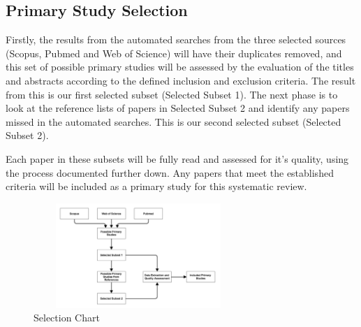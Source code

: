 \documentclass[12pt]{article}
\begin{document}
\subsection{Primary Study Selection}
Firstly, the results from the automated searches from the three selected sources (Scopus, Pubmed and Web of Science) will have their duplicates removed, and this set of possible primary studies will be assessed by the evaluation of the titles and abstracts according to the defined inclusion and exclusion criteria. The result from this is our first selected subset (Selected Subset 1). The next phase is to look at the reference lists of papers in Selected Subset 2 and identify any papers missed in the automated searches. This is our second selected subset (Selected Subset 2). \par 
Each paper in these subsets will be fully read and assessed for it's quality, using the process documented further down. Any papers that meet the established criteria will be included as a primary study for this systematic review. 

\begin{figure}[H]
\centering
\includegraphics[width=300px, height=150px]{images/PRISMA - Chart.png}
\caption{Selection Chart}
\end{figure}
\end{document}
